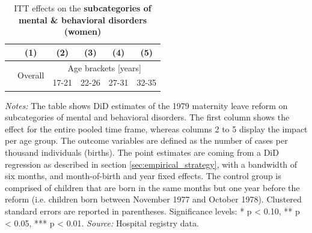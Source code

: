 \documentclass[11pt, a4paper,draft]{article} %
\begin{document}
\newpage
{} 
\vspace*{\fill}
\begin{table}[H] \centering 
	\begin{threeparttable} \centering \caption{ITT effects on the \textbf{subcategories of mental \& behavioral disorders (women)}}\label{tab: ITT_across_d5subcategories_per_age_group_women}
		{\def\sym#1{\ifmmode^{#1}\else\(^{#1}\)\fi} 
			\begin{tabular}{l*{5}{c}}
				\toprule 
				&\multicolumn{1}{c}{(1)}&\multicolumn{1}{c}{(2)}&\multicolumn{1}{c}{(3)}&\multicolumn{1}{c}{(4)}&\multicolumn{1}{c}{(5)}\\
				\midrule
				&\multirow{2}{*}{Overall} & \multicolumn{4}{c}{Age brackets [years]} \\ 
				\cmidrule(lr){3-6}
				&&\multicolumn{1}{c}{17-21}&\multicolumn{1}{c}{22-26}&\multicolumn{1}{c}{27-31}&\multicolumn{1}{c}{32-35}\\
				
				\midrule
				
				
				
				\bottomrule 
		\end{tabular}}
	\end{threeparttable} 
	\begin{minipage}{0.9\linewidth}
		\scriptsize \emph{Notes:} The table shows DiD estimates of the 1979 maternity leave reform on subcategories of mental and behavioral disorders. The first column shows the effect for the entire pooled time frame, whereas columns 2 to 5 display the impact per age group. The outcome variables are defined as the number of cases per thousand individuals (births). The point estimates are coming from a DiD regression as described in section \ref{sec:empirical_strategy}, with a bandwidth of six months, and month-of-birth and year fixed effects. The control group is comprised of children that are born in the same months but one year before the reform (i.e. children born between November 1977 and October 1978). Clustered standard errors are reported in parentheses. \newline Significance levels: * p < 0.10, ** p < 0.05, *** p < 0.01. \newline 	\emph{Source:} Hospital registry data.
	\end{minipage}
\end{table} 
\vspace*{\fill}\clearpage 
\restoregeometry
\end{document}
